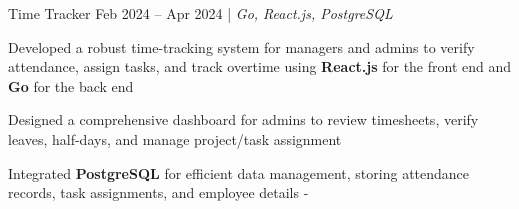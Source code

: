 \resumeSubheadings
{Time Tracker }
{Feb 2024 -- Apr 2024} {}{}{| \textit{Go, React.js, PostgreSQL}} \resumeItemListStart \item Developed a robust time-tracking system for managers and admins to verify attendance, assign tasks, and track overtime using \textbf{React.js} for the front end and \textbf{Go} for the back end \item Designed a comprehensive dashboard for admins to review timesheets, verify leaves, half-days, and manage project/task assignment \item Integrated \textbf{PostgreSQL} for efficient data management, storing attendance records, task assignments, and employee details \resumeItemListEnd-